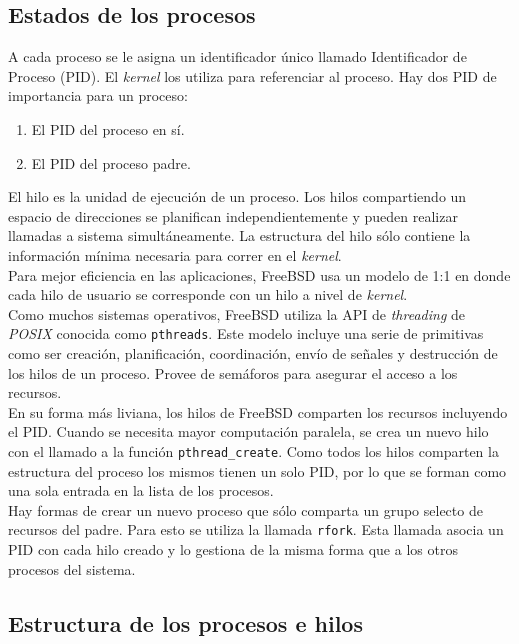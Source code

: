 \documentclass[a4paper]{book}
\begin{document}
\subsection{Estados de los procesos}

A cada proceso se le asigna un identificador único llamado Identificador de Proceso (PID). El \emph{kernel} los utiliza para referenciar al proceso.
Hay dos PID de importancia para un proceso:
\begin{enumerate}
\item El PID del proceso en sí.
\item El PID del proceso padre.
\end{enumerate}

El hilo es la unidad de ejecución de un proceso. Los hilos compartiendo un espacio de direcciones se planifican independientemente y pueden realizar llamadas a sistema simultáneamente. La estructura del hilo sólo contiene la información mínima necesaria para correr en el \emph{kernel}.\\

Para mejor eficiencia en las aplicaciones, FreeBSD usa un modelo de 1:1 en donde cada hilo de usuario se corresponde con un hilo a nivel de \emph{kernel}.\\

Como muchos sistemas operativos, FreeBSD utiliza la API de \emph{threading} de \emph{POSIX} conocida como \verb|pthreads|. Este modelo incluye una serie de primitivas como ser creación, planificación, coordinación, envío de señales y destrucción de los hilos de un proceso. Provee de semáforos para asegurar el acceso a los recursos.\\

En su forma más liviana, los hilos de FreeBSD comparten los recursos incluyendo el PID. Cuando se necesita mayor computación paralela, se crea un nuevo hilo con el llamado a la función \verb|pthread_create|. Como todos los hilos comparten la estructura del proceso los mismos tienen un solo PID, por lo que se forman como una sola entrada en la lista de los procesos.\\

Hay formas de crear un nuevo proceso que sólo comparta un grupo selecto de recursos del padre. Para esto se utiliza la llamada \verb|rfork|. Esta llamada asocia un PID con cada hilo creado y lo gestiona de la misma forma que a los otros procesos del sistema.

\subsection{Estructura de los procesos e hilos}
\end{document}
